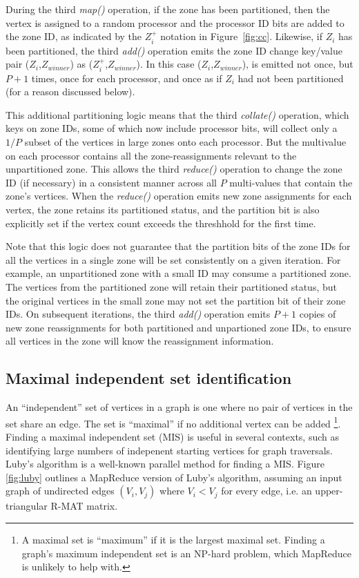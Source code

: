 During the third {\it map()} operation, if the zone has been
partitioned, then the vertex is assigned to a random processor and the
processor ID bits are added to the zone ID, as indicated by the
$Z_i^+$ notation in Figure~\ref{fig:cc}.  Likewise, if $Z_i$ has been
partitioned, the third {\it add()} operation emits the zone ID change
key/value pair ($Z_i$,$Z_{winner}$) as ($Z_i^+$,$Z_{winner}$).  In
this case ($Z_i$,$Z_{winner}$), is emitted not once, but $P+1$ times,
once for each processor, and once as if $Z_i$ had not been partitioned
(for a reason discussed below).

This additional partitioning logic means that the third {\it
collate()} operation, which keys on zone IDs, some of which now
include processor bits, will collect only a $1/P$ subset of the
vertices in large zones onto each processor.  But the multivalue on
each processor contains all the zone-reassignments relevant to the
unpartitioned zone.  This allows the third {\it reduce()} operation to
change the zone ID (if necessary) in a consistent manner across all
$P$ multi-values that contain the zone's vertices.  When the {\it
reduce()} operation emits new zone assignments for each vertex, the
zone retains its partitioned status, and the partition bit is also
explicitly set if the vertex count exceeds the threshhold for the
first time.

Note that this logic does not guarantee that the partition bits of the
zone IDs for all the vertices in a single zone will be set
consistently on a given iteration.  For example, an unpartitioned zone
with a small ID may consume a partitioned zone.  The vertices from the
partitioned zone will retain their partitioned status, but the
original vertices in the small zone may not set the partition bit of
their zone IDs.  On subsequent iterations, the third {\it add()}
operation emits $P+1$ copies of new zone reassignments for both
partitioned and unpartioned zone IDs, to ensure all vertices in the
zone will know the reassignment information.

\subsection{Maximal independent set identification}

An ``independent'' set of vertices in a graph is one where no pair of
vertices in the set share an edge.  The set is ``maximal'' if no
additional vertex can be added \footnote{A maximal set is ``maximum''
if it is the largest maximal set.  Finding a graph's maximum
independent set is an NP-hard problem, which MapReduce is unlikely to
help with.}.  Finding a maximal independent set (MIS) is useful in
several contexts, such as identifying large numbers of indepenent
starting vertices for graph traversals.  Luby's algorithm \cite{Luby}
is a well-known parallel method for finding a MIS.  Figure
\ref{fig:luby} outlines a MapReduce version of Luby's algorithm,
assuming an input graph of undirected edges $(V_i,V_j)$ where $V_i <
V_j$ for every edge, i.e. an upper-triangular R-MAT matrix.

